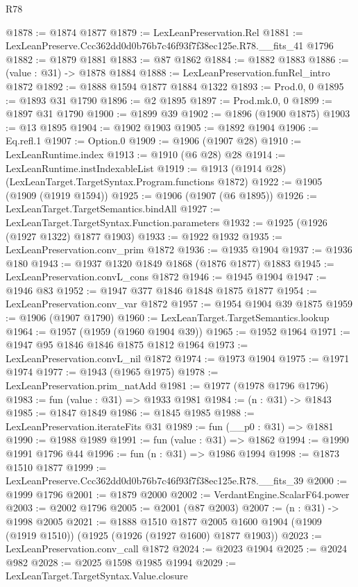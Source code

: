 \begin{lexlean}{R78}
\begin{coremodule}
@1878 := @1874 @1877
@1879 := LexLeanPreservation.Rel
@1881 := LexLeanPreserve.Ccc362dd0d0b76b7c46f93f7f38ec125e.R78.__fits_41 @1796
@1882 := @1879 @1881
@1883 := @87 @1862
@1884 := @1882 @1883
@1886 := (value : @31) -> @1878 @1884
@1888 := LexLeanPreservation.funRel_intro @1872
@1892 := @1888 @1594 @1877 @1884 @1322
@1893 := Prod.{0, 0}
@1895 := @1893 @31 @1790
@1896 := @2 @1895
@1897 := Prod.mk.{0, 0}
@1899 := @1897 @31 @1790
@1900 := @1899 @39
@1902 := @1896 (@1900 @1875)
@1903 := @13 @1895
@1904 := @1902 @1903
@1905 := @1892 @1904
@1906 := Eq.refl.{1}
@1907 := Option.{0}
@1909 := @1906 (@1907 @28)
@1910 := LexLeanRuntime.index
@1913 := @1910 (@6 @28) @28
@1914 := LexLeanRuntime.instIndexableList
@1919 := @1913 (@1914 @28) (LexLeanTarget.TargetSyntax.Program.functions @1872)
@1922 := @1905 (@1909 (@1919 @1594))
@1925 := @1906 (@1907 (@6 @1895))
@1926 := LexLeanTarget.TargetSemantics.bindAll
@1927 := LexLeanTarget.TargetSyntax.Function.parameters
@1932 := @1925 (@1926 (@1927 @1322) @1877 @1903)
@1933 := @1922 @1932
@1935 := LexLeanPreservation.conv_prim @1872
@1936 := @1935 @1904
@1937 := @1936 @180
@1943 := @1937 @1320 @1849 @1868 (@1876 @1877) @1883
@1945 := LexLeanPreservation.convL_cons @1872
@1946 := @1945 @1904
@1947 := @1946 @83
@1952 := @1947 @377 @1846 @1848 @1875 @1877
@1954 := LexLeanPreservation.conv_var @1872
@1957 := @1954 @1904 @39 @1875
@1959 := @1906 (@1907 @1790)
@1960 := LexLeanTarget.TargetSemantics.lookup
@1964 := @1957 (@1959 (@1960 @1904 @39))
@1965 := @1952 @1964
@1971 := @1947 @95 @1846 @1846 @1875 @1812 @1964
@1973 := LexLeanPreservation.convL_nil @1872
@1974 := @1973 @1904
@1975 := @1971 @1974
@1977 := @1943 (@1965 @1975)
@1978 := LexLeanPreservation.prim_natAdd
@1981 := @1977 (@1978 @1796 @1796)
@1983 := fun (value : @31) => @1933 @1981
@1984 := (n : @31) -> @1843
@1985 := @1847 @1849
@1986 := @1845 @1985
@1988 := LexLeanPreservation.iterateFits @31
@1989 := fun (__p0 : @31) => @1881
@1990 := @1988 @1989
@1991 := fun (value : @31) => @1862
@1994 := @1990 @1991 @1796 @44
@1996 := fun (n : @31) => @1986 @1994
@1998 := @1873 @1510 @1877
@1999 := LexLeanPreserve.Ccc362dd0d0b76b7c46f93f7f38ec125e.R78.__fits_39
@2000 := @1999 @1796
@2001 := @1879 @2000
@2002 := VerdantEngine.ScalarF64.power
@2003 := @2002 @1796
@2005 := @2001 (@87 @2003)
@2007 := (n : @31) -> @1998 @2005
@2021 := @1888
    @1510
    @1877
    @2005
    @1600
    @1904
    (@1909 (@1919 @1510))
    (@1925 (@1926 (@1927 @1600) @1877 @1903))
@2023 := LexLeanPreservation.conv_call @1872
@2024 := @2023 @1904
@2025 := @2024 @982
@2028 := @2025 @1598 @1985 @1994
@2029 := LexLeanTarget.TargetSyntax.Value.closure

\end{coremodule}
\end{lexlean}
